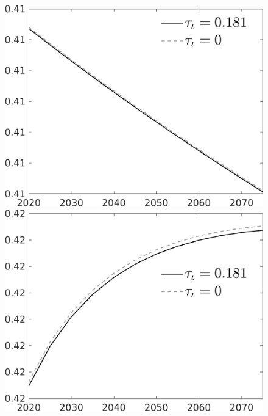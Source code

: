 \begin{figure}[h!!]
\begin{minipage}[]{0.32\textwidth}
\end{minipage}
\begin{minipage}[]{0.32\textwidth}
\includegraphics[width=1\textwidth]{../../codding_model/own_basedOnFried/optimalPol_010922_revision/figures/all_13Sept22/CompTauf_bytaul_Reg0_EY_spillover0_nsk0_xgr0_knspil0_sep0_LFlimit0_emsbase0_countec0_GovRev0_etaa0.79_lgd1.png}
\end{minipage}
\begin{minipage}[]{0.32\textwidth}
\includegraphics[width=1\textwidth]{../../codding_model/own_basedOnFried/optimalPol_010922_revision/figures/all_13Sept22/CompTauf_bytaul_Equlab_Reg0_EY_spillover0_nsk0_xgr0_knspil0_sep0_LFlimit0_emsbase0_countec0_GovRev0_etaa0.79_lgd1.png}
\end{minipage}
\end{figure}